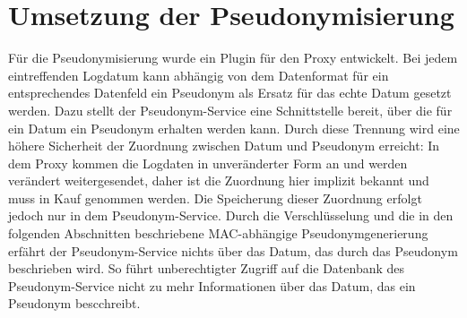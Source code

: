 \section{Umsetzung der Pseudonymisierung} %

\label{sec_impl_pseudonymity}






Für die Pseudonymisierung wurde ein Plugin für den Proxy entwickelt. Bei jedem eintreffenden Logdatum kann abhängig von dem Datenformat für ein entsprechendes Datenfeld ein Pseudonym als Ersatz für das echte Datum gesetzt werden. Dazu stellt der Pseudonym-Service eine Schnittstelle bereit, über die für ein Datum ein Pseudonym erhalten werden kann. Durch diese Trennung wird eine höhere Sicherheit der Zuordnung zwischen Datum und Pseudonym erreicht: In dem Proxy kommen die Logdaten in unveränderter Form an und werden verändert weitergesendet, daher ist die Zuordnung hier implizit bekannt und muss in Kauf genommen werden. Die Speicherung dieser Zuordnung erfolgt jedoch nur in dem Pseudonym-Service. Durch die Verschlüsselung und die in den folgenden Abschnitten beschriebene MAC-abhängige Pseudonymgenerierung erfährt der Pseudonym-Service nichts über das Datum, das durch das Pseudonym beschrieben wird. So führt unberechtigter Zugriff auf die Datenbank des Pseudonym-Service nicht zu mehr Informationen über das Datum, das ein Pseudonym bescchreibt.

